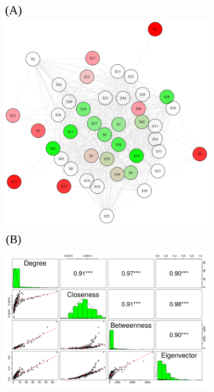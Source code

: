 \documentclass{article}
\begin{document}
\begin{figure}[htbp]
  \centering
  \begin{minipage}[t]{.45\textwidth}
\includegraphics[width=1cm]{(A).png}    \includegraphics[scale=.3]{4A.pdf}
    \label{fig:figure1}
  \end{minipage}
  \hfill
  \begin{minipage}[t]{.45\textwidth}
\includegraphics[width=1cm]{(B).png}    \includegraphics[scale=.2]{4B.pdf}
    \label{fig:figure2}
  \end{minipage}
  

\end{figure}
\end{document}

